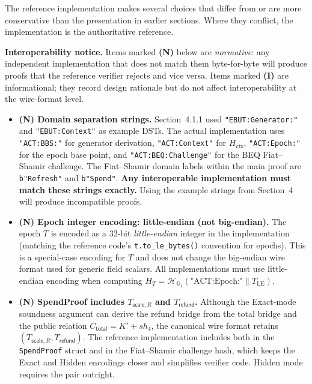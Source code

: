 \documentclass[11pt]{article}
\theoremstyle{definitionstyle}
\theoremstyle{plain}
\begin{document}
The reference implementation makes several choices that differ from or are
more conservative than the presentation in earlier sections.  Where they
conflict, the implementation is the authoritative reference.

\textbf{Interoperability notice.}  Items marked \textbf{(N)} below are
\emph{normative}: any independent implementation that does not match them
byte-for-byte will produce proofs that the reference verifier rejects and
vice versa.  Items marked \textbf{(I)} are informational; they record
design rationale but do not affect interoperability at the wire-format level.

\begin{itemize}[leftmargin=*]

\item \textbf{(N) Domain separation strings.}
  Section~4.1.1 used \texttt{"EBUT:Generator:"} and \texttt{"EBUT:Context"}
  as example DSTs.  The actual implementation uses \texttt{"ACT:BBS:"} for
  generator derivation, \texttt{"ACT:Context"} for $H_{\mathsf{ctx}}$,
  \texttt{"ACT:Epoch:"} for the epoch base point, and
  \texttt{"ACT:BEQ:Challenge"} for the BEQ Fiat--Shamir challenge.  The
  Fiat--Shamir domain labels within the main proof are \texttt{b"Refresh"}
  and \texttt{b"Spend"}.  \textbf{Any interoperable implementation must
  match these strings exactly.}  Using the example strings from Section~4
  will produce incompatible proofs.

\item \textbf{(N) Epoch integer encoding: little-endian (not big-endian).}
  The epoch $T$ is encoded as a 32-bit \emph{little-endian} integer in the
  implementation (matching the reference code's \texttt{t.to\_le\_bytes()}
  convention for epochs).  This is a special-case encoding for $T$ and does
  not change the big-endian wire format used for generic field scalars.  All
  implementations must use little-endian encoding when
  computing $H_T = \mathcal{H}_{\mathbb{G}_1}(\text{"ACT:Epoch:"} \parallel
  T_{\text{LE}})$.

\item \textbf{(N) SpendProof includes $T_{\mathsf{scale},R}$ and $T_{\mathsf{refund}}$.}
  Although the Exact-mode soundness argument can derive the refund bridge from
  the total bridge and the public relation $C_{\mathsf{total}} = K' + s h_4$,
  the canonical wire format retains $(T_{\mathsf{scale},R},
  T_{\mathsf{refund}})$.  The reference implementation includes both in the
  \texttt{SpendProof} struct and in the Fiat--Shamir challenge hash, which
  keeps the Exact and Hidden encodings closer and simplifies verifier code.
  Hidden mode requires the pair outright.


\end{itemize}
\end{document}
